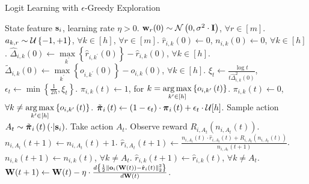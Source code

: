 \begin{algorithm}[t]
	\caption{Logit Learning with $\epsilon$-Greedy Exploration}
	\label{alg:logit_learning_eps_greedy_exploration}
	\begin{algorithmic}
		 State feature ${\mathbf{s}}_i$, learning rate $\eta > 0$.
		\STATE ${\mathbf{w}}_r(0) \sim {\mathcal{N}}\left( 0, \sigma^2 \cdot {\mathbf{I}} \right)$, $\forall r \in [m]$.
		\STATE $a_{k, r} \sim {\mathcal{U}}\left\{-1, +1\right\}$, $\forall k \in [h]$, $\forall r \in [m]$.
		\STATE $\hat{r}_{i,k}\left(0\right) \gets 0$, $n_{i,k}\left(0\right) \gets 0$, $\forall k \in [h]$.
		\STATE $\hat{\Delta}_{i,k}\left(0\right) \gets \max\limits_{k^\prime}\left\{ \hat{r}_{i,k^\prime}\left(0\right) \right\} - \hat{r}_{i,k}\left(0\right)$, $\forall k \in [h]$.
		\STATE $\tilde{\Delta}_{i,k}\left(0\right) \gets \max\limits_{k^\prime}\left\{ o_{i,k^\prime}\left(0\right) \right\} - o_{i,k}\left(0\right)$, $\forall k \in [h]$.
		\STATE $\xi_t \gets \frac{\log{t}}{t \hat{\Delta}_{i,k}^2\left(0\right)}$, $\epsilon_t \gets \min\left\{ \frac{1}{2 h}, \xi_t \right\}$.
		\STATE $\pi_{i, k}\left(t\right) \gets 1$, for $k = \operatorname*{arg\,max}\limits_{k^\prime \in \left[h\right]}\left\{ o_{i, k^\prime}\left(t\right)\right\}$.
		\STATE $\pi_{i, k}\left(t\right) \gets 0$, $\forall k \not= \operatorname*{arg\,max}\limits_{k^\prime \in \left[h\right]}\left\{ o_{i, k^\prime}\left(t\right)\right\}$.
		\STATE $\tilde{{\boldsymbol{\pi}}}_i\left(t\right) \gets \left( 1 - \epsilon_t \right) \cdot  {\boldsymbol{\pi}}_i\left(t\right) + \epsilon_t \cdot {\mathcal{U}}{\left[ h \right]}$.
		\STATE Sample action $A_{t} \sim \tilde{{\boldsymbol{\pi}}}_{i}\left(t\right)\left(\cdot \middle| {\mathbf{s}}_i \right)$.
		\STATE Take action $A_{t}$. Observe reward $R_{i, A_{t}}\left(n_{i, A_{t}}\left(t\right) \right)$.
		\STATE $n_{i, A_{t}}\left(t+1\right) \gets n_{i, A_{t}}\left(t\right) + 1$.
		\STATE $\hat{r}_{i,A_{t}}\left(t+1\right) \gets \frac{n_{i, A_{t}}\left(t\right) \cdot \hat{r}_{i,A_{t}}\left(t\right) + R_{i, A_{t}}\left(n_{i, A_{t}}\left(t\right)\right) }{n_{i, A_{t}}\left(t+1\right)}$.
		\STATE $n_{i, k}\left(t+1\right) \gets n_{i, k}\left(t\right)$, $\forall k \not= A_t$.
		\STATE $\hat{r}_{i,k}\left(t+1\right) \gets \hat{r}_{i,k}\left(t\right)$, $\forall k \not= A_t$.
		\STATE ${\mathbf{W}}(t+1) \leftarrow {\mathbf{W}}(t) - \eta \cdot \frac{d \left\{ \frac{1}{2} \left\| {\mathbf{o}}_i\left( {\mathbf{W}}\left(t\right)\right) - \hat{{\mathbf{r}}}_i\left(t\right) \right\|_2^2 \right\}}{d {\mathbf{W}}(t)}$.
		\ENDFOR
	\end{algorithmic}
\end{algorithm}